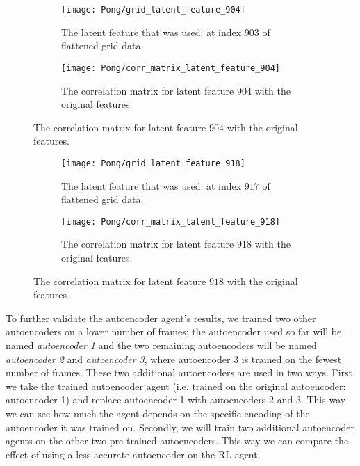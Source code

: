 \begin{figure}[h]
	\centering
	\begin{subfigure}[b]{0.2\textwidth}
		\texttt{[image: Pong/grid\_latent\_feature\_904]}
		\caption{The latent feature that was used: at index $903$ of flattened grid data.}
		\label{fig:ae-latent-feature-pong} 
	\end{subfigure}\hfill
	\begin{subfigure}[b]{0.75\textwidth}
		\texttt{[image: Pong/corr\_matrix\_latent\_feature\_904]}
		\caption{The correlation matrix for latent feature $904$ with the original features.}
		\label{fig:ae-latent-feature-corr-matrix-pong}
	\end{subfigure}
	\caption{The correlation matrix for latent feature $904$ with the original features.}
	\label{fig:latent-feature-corr-pong}
\end{figure}

\begin{figure}[h]
	\centering
	\begin{subfigure}[b]{0.2\textwidth}
		\texttt{[image: Pong/grid\_latent\_feature\_918]}
		\caption{The latent feature that was used: at index $917$ of flattened grid data.}
		\label{fig:ae-latent-feature-pong2} 
	\end{subfigure}\hfill
	\begin{subfigure}[b]{0.75\textwidth}
		\texttt{[image: Pong/corr\_matrix\_latent\_feature\_918]}
		\caption{The correlation matrix for latent feature $918$ with the original features.}
		\label{fig:ae-latent-feature-corr-matrix-pong2}
	\end{subfigure}
	\caption{The correlation matrix for latent feature $918$ with the original features.}
	\label{fig:latent-feature-corr-pong2}
\end{figure}

To further validate the autoencoder agent's results, we trained two other autoencoders on a lower number of frames; the autoencoder used so far will be named \emph{autoencoder 1} and the two remaining autoencoders will be named \emph{autoencoder 2} and \emph{autoencoder 3}, where autoencoder 3 is trained on the fewest number of frames. These two additional autoencoders are used in two ways. First, we take the trained autoencoder agent (i.e. trained on the original autoencoder: autoencoder 1) and replace autoencoder 1 with autoencoders 2 and 3. This way we can see how much the agent depends on the specific encoding of the autoencoder it was trained on. Secondly, we will train two additional autoencoder agents on the other two pre-trained autoencoders. This way we can compare the effect of using a less accurate autoencoder on the RL agent.

